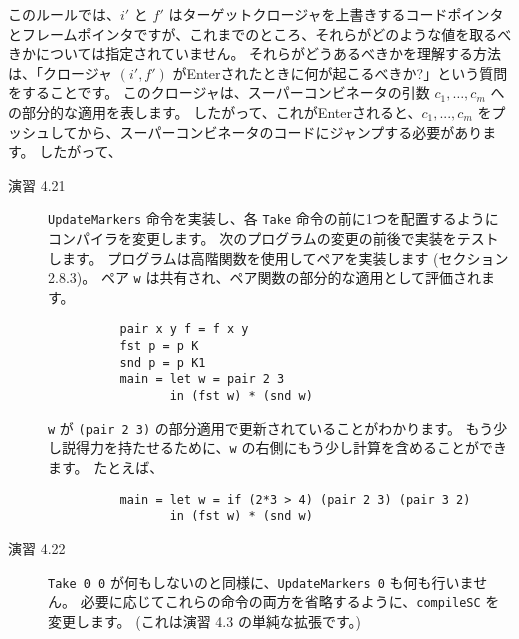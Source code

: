 \documentclass{jarticle}
\begin{document}
このルールでは、$i'$ と $f'$ はターゲットクロージャを上書きするコードポインタとフレームポインタですが、これまでのところ、それらがどのような値を取るべきかについては指定されていません。
それらがどうあるべきかを理解する方法は、「クロージャ $(i', f')$ がEnterされたときに何が起こるべきか?」という質問をすることです。
このクロージャは、スーパーコンビネータの引数 $c_1, \ldots, c_m$ への部分的な適用を表します。
したがって、これがEnterされると、$c_1, ..., c_m$ をプッシュしてから、スーパーコンビネータのコードにジャンプする必要があります。
したがって、


\begin{description}
	\item[演習 4.21] \texttt{UpdateMarkers} 命令を実装し、各 \texttt{Take} 命令の前に1つを配置するようにコンパイラを変更します。
		次のプログラムの変更の前後で実装をテストします。
		プログラムは高階関数を使用してペアを実装します (セクション 2.8.3)。
		ペア \texttt{w} は共有され、ペア関数の部分的な適用として評価されます。
		\begin{verbatim}
          pair x y f = f x y
          fst p = p K
          snd p = p K1
          main = let w = pair 2 3
                 in (fst w) * (snd w)
        \end{verbatim}
		\texttt{w} が \texttt{(pair 2 3)} の部分適用で更新されていることがわかります。
		もう少し説得力を持たせるために、\texttt{w} の右側にもう少し計算を含めることができます。
		たとえば、
		\begin{verbatim}
          main = let w = if (2*3 > 4) (pair 2 3) (pair 3 2)
                 in (fst w) * (snd w)
        \end{verbatim}
	\item[演習 4.22] \texttt{Take 0 0} が何もしないのと同様に、\texttt{UpdateMarkers 0} も何も行いません。
		必要に応じてこれらの命令の両方を省略するように、\texttt{compileSC} を変更します。
		(これは演習 4.3 の単純な拡張です。)
\end{description}
\end{document}
